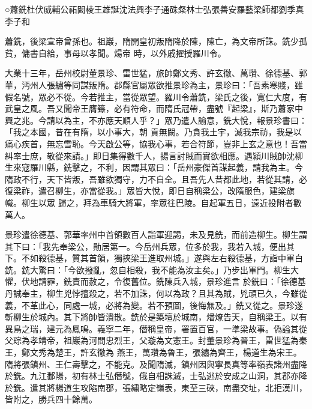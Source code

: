 
\begin{pinyinscope}

 ○蕭銑杜伏威輔公祏闞棱王雄誕沈法興李子通硃粲林士弘張善安羅藝梁師都劉季真李子和



 蕭銑，後梁宣帝曾孫也。祖巖，隋開皇初叛隋降於陳，陳亡，為文帝所誅。銑少孤貧，傭書自給，事母以孝聞。煬帝
 時，以外戚擢授羅川令。



 大業十三年，岳州校尉董景珍、雷世猛，旅帥鄭文秀、許玄徹、萬瓚、徐德基、郭華，沔州人張繡等同謀叛隋。郡縣官屬眾欲推景珍為主，景珍曰：「吾素寒賤，雖假名號，眾必不從。今若推主，當從眾望。羅川令蕭銑，梁氏之後，寬仁大度，有武皇之風。吾又聞帝王膺籙，必有符命，而隋氏冠帶，盡號『起梁』，斯乃蕭家中興之兆。今請以為主，不亦應天順人乎？」眾乃遣人諭意，銑大悅，報景珍書曰：「我之本國，昔在有隋，以小事大，朝
 貢無闕。乃貪我土宇，滅我宗祊，我是以痛心疾首，無忘雪恥。今天啟公等，協我心事，若合符節，豈非上玄之意也！吾當糾率士庶，敬從來請。」即日集得數千人，揚言討賊而實欲相應。遇潁川賊帥沈柳生來寇羅川縣，銑擊之，不利，因謂其眾曰：「岳州豪傑首謀起義，請我為主。今隋政不行，天下皆叛，吾雖欲獨守，力不自全。且吾先人昔都此地，若從其請，必復梁祚，遣召柳生，亦當從我。」眾皆大悅，即日自稱梁公，改隋服色，建梁旗幟。柳生以眾
 歸之，拜為車騎大將軍，率眾往巴陵。自起軍五日，遠近投附者數萬人。



 景珍遣徐德基、郭華率州中首領數百人詣軍迎謁，未及見銑，而前造柳生。柳生謂其下曰：「我先奉梁公，勛居第一。今岳州兵眾，位多於我，我若入城，便出其下。不如殺德基，質其首領，獨挾梁王進取州城。」遂與左右殺德基，方詣中軍白銑。銑大驚曰：「今欲撥亂，忽自相殺，我不能為汝主矣。」乃步出軍門。柳生大懼，伏地請罪，銑責而赦之，令復舊位。銑陳兵入城，景珍進言
 於銑曰：「徐德基丹誠奉主，柳生兇悖擅殺之，若不加誅，何以為政？且其為賊，兇頑已久，今雖從義，不革此心，同處一城，必將為變。若不預圖，後悔無及。」銑又從之。景珍遂斬柳生於城內。其下將帥皆潰散。銑於是築壇於城南，燔燎告天，自稱梁王。以有異鳥之瑞，建元為鳳鳴。義寧二年，僭稱皇帝，署置百官，一準梁故事。偽謚其從父琮為孝靖帝，祖巖為河間忠烈王，父璇為文憲王。封董景珍為晉王，雷世猛為秦王，鄭文秀為楚王，許玄徹為
 燕王，萬瓚為魯王，張繡為齊王，楊道生為宋王。隋將張鎮州、王仁壽擊之，不能克。及聞隋滅，鎮州因與寧長真等率嶺表諸州盡降於銑。九江鄱陽，初有林士弘僭號，俄自相誅滅，士弘逃於安成之山洞，其郡亦降於銑。遣其將楊道生攻陷南郡，張繡略定嶺表，東至三硤，南盡交址，北拒漢川，皆附之，勝兵四十餘萬。




\end{pinyinscope}
